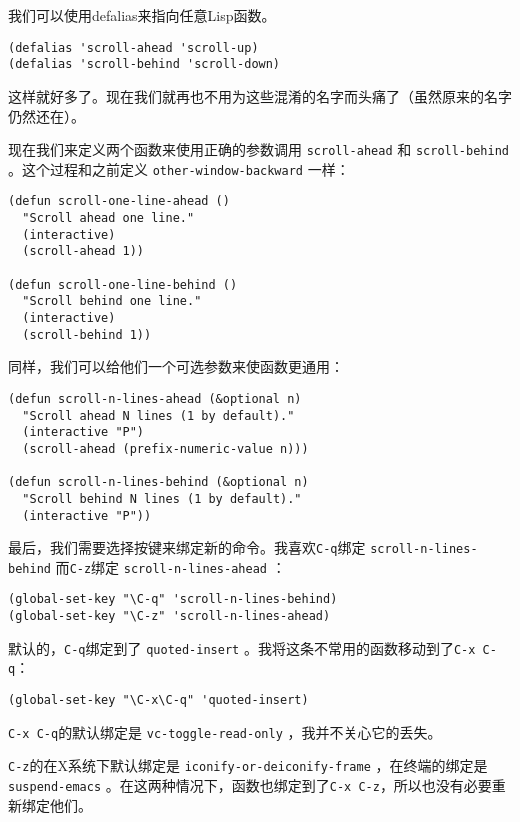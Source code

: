 我们可以使用defalias来指向任意Lisp函数。

\begin{verbatim}
(defalias 'scroll-ahead 'scroll-up)
(defalias 'scroll-behind 'scroll-down)
\end{verbatim}

这样就好多了。现在我们就再也不用为这些混淆的名字而头痛了（虽然原来的名字仍然还在）。

现在我们来定义两个函数来使用正确的参数调用 \texttt{scroll-ahead} 和 \texttt{scroll-behind} 。这个过程和之前定义 \texttt{other-window-backward} 一样：

\begin{verbatim}
(defun scroll-one-line-ahead ()
  "Scroll ahead one line."
  (interactive)
  (scroll-ahead 1))

(defun scroll-one-line-behind ()
  "Scroll behind one line."
  (interactive)
  (scroll-behind 1))
\end{verbatim}

同样，我们可以给他们一个可选参数来使函数更通用：

\begin{verbatim}
(defun scroll-n-lines-ahead (&optional n)
  "Scroll ahead N lines (1 by default)."
  (interactive "P")
  (scroll-ahead (prefix-numeric-value n)))
   
(defun scroll-n-lines-behind (&optional n)
  "Scroll behind N lines (1 by default)."
  (interactive "P"))
\end{verbatim}

最后，我们需要选择按键来绑定新的命令。我喜欢\verb|C-q|绑定 \texttt{scroll-n-lines-behind} 而\verb|C-z|绑定 \texttt{scroll-n-lines-ahead} ：

\begin{verbatim}
(global-set-key "\C-q" 'scroll-n-lines-behind)
(global-set-key "\C-z" 'scroll-n-lines-ahead)
\end{verbatim}

默认的，\verb|C-q|绑定到了 \texttt{quoted-insert} 。我将这条不常用的函数移动到了\verb|C-x C-q|：

\begin{verbatim}
(global-set-key "\C-x\C-q" 'quoted-insert)
\end{verbatim}

\verb|C-x C-q|的默认绑定是 \texttt{vc-toggle-read-only} ，我并不关心它的丢失。

\verb|C-z|的在X系统下默认绑定是 \texttt{iconify-or-deiconify-frame} ，在终端的绑定是 \texttt{suspend-emacs} 。在这两种情况下，函数也绑定到了\verb|C-x C-z|，所以也没有必要重新绑定他们。

